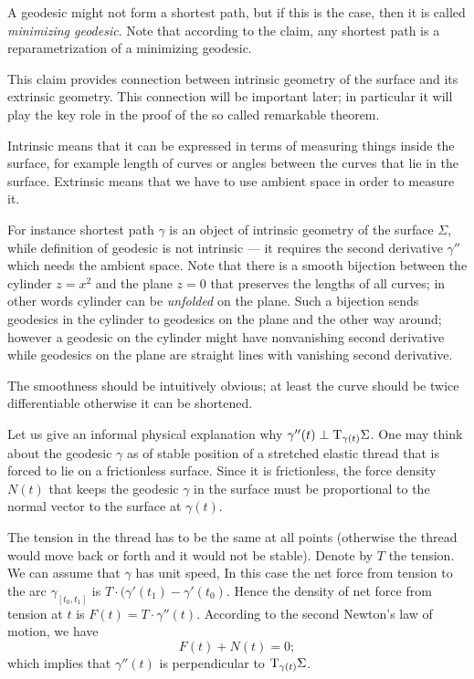 A geodesic might not form a shortest path, but if this is the case, then it is called \emph{minimizing geodesic}.
Note that according to the claim, any shortest path is a reparametrization of a minimizing geodesic.

This claim provides connection between intrinsic geometry of the surface and its extrinsic geometry.
This connection will be important later; in particular it will play the key role in the proof of the so called remarkable theorem. %

Intrinsic means that it can be expressed in terms of measuring things inside the surface, for example length of curves or angles between the curves that lie in the surface.
Extrinsic means that we have to use ambient space in order to measure it.

For instance shortest path $\gamma$ is an object of intrinsic geometry of the surface $\Sigma$,
while definition of geodesic is not intrinsic --- it requires the second derivative $\gamma''$ which needs the ambient space.
Note that there is a smooth bijection between the cylinder $z=x^2$ and the plane $z=0$ that preserves the lengths of all curves; in other words cylinder can be \emph{unfolded} on the plane.
Such a bijection sends geodesics in the cylinder to geodesics on the plane and the other way around; however a geodesic on the cylinder might have nonvanishing second derivative while geodesics on the plane are straight lines with vanishing second derivative.



The smoothness should be intuitively obvious; at least the curve should be twice differentiable otherwise it can be shortened.

Let us give an informal physical explanation why $\gamma''(t)\perp\mathrm{T}_{\gamma(t)}\Sigma$.
One may think about the geodesic $\gamma$ as of stable position of a stretched elastic thread that is forced to lie on a frictionless surface.
Since it is frictionless, the force density $N(t)$ that keeps the geodesic $\gamma$ in the surface must be proportional to the normal vector to the surface at $\gamma(t)$.

The tension in the thread has to be the same at all points (otherwise the thread would move back or forth and it would not be stable).
Denote by $T$ the tension.
We can assume that $\gamma$ has unit speed,
In this case the net force from tension to the arc $\gamma_{[t_0,t_1]}$ is $T\cdot(\gamma'(t_1)-\gamma'(t_0)$.
Hence the density of net force from tension at $t$ is $F(t)=T\cdot\gamma''(t)$.
According to the second Newton's law of motion, we have 
\[F(t)+N(t)=0;\]
which implies that  $\gamma''(t)$ is perpendicular to $\mathrm{T}_{\gamma(t)}\Sigma$.

